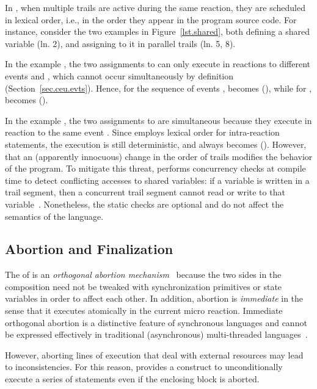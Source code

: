 In \CEU, when multiple trails are active during the same reaction, they are
scheduled in lexical order, i.e., in the order they appear in the program
source code.
%
For instance, consider the two examples in Figure~\ref{lst.shared}, both
defining a shared variable (ln. 2), and assigning to it in parallel trails (ln.
5, 8).

In the example \ax, the two assignments to  can only execute in
reactions to different events  and , which cannot occur
simultaneously by definition (Section~\ref{sec.ceu.evts}).
Hence, for the sequence of events ,  becomes 
(), while for ,  becomes 
().

In the example \bx, the two assignments to  are simultaneous because
they execute in reaction to the same event .
Since \CEU employs lexical order for intra-reaction statements, the execution
is still deterministic, and  always becomes  ().
%
However, that an (apparently innocuous) change in the order of trails modifies
the behavior of the program.
%
To mitigate this threat, \CEU performs concurrency checks at compile time to
detect conflicting accesses to shared variables:
if a variable is written in a trail segment, then a concurrent trail segment
cannot read or write to that variable~\cite{ceu.sensys13}.
%
Nonetheless, the static checks are optional and do not affect the semantics of
the language.

\subsection{Abortion and Finalization}

The  of \CEU is an \emph{orthogonal abortion
mechanism}~\cite{esterel.preemption} because the two sides in the composition
need not be tweaked with synchronization primitives or state variables in order
to affect each other.
%
In addition, abortion is \emph{immediate} in the sense that it executes
atomically in the current micro reaction.
%
Immediate orthogonal abortion is a distinctive feature of synchronous languages
and cannot be expressed effectively in traditional (asynchronous)
multi-threaded languages~\cite{esterel.preemption,sync_async.threadsstop}.

However, aborting lines of execution that deal with external resources may lead
to inconsistencies.
%
For this reason, \CEU provides a  construct to unconditionally
execute a series of statements even if the enclosing block is aborted.

